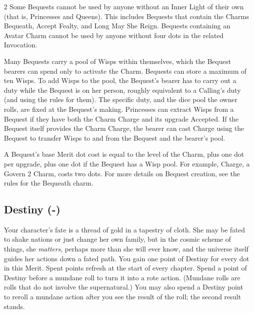 \begin{multicols}{2}
Some Bequests cannot be used by anyone without an Inner Light of their own (that is, Princesses and Queens). This includes Bequests that contain the Charms Bequeath, Accept Fealty, and Long May She Reign. Bequests containing an Avatar Charm cannot be used by anyone without four dots in the related Invocation.

Many Bequests carry a pool of Wisps within themselves, which the Bequest bearers can spend only to activate the Charm. Bequests can store a maximum of ten Wisps. To add Wisps to the pool, the Bequest’s bearer has to carry out a duty while the Bequest is on her person, roughly equivalent to a Calling's duty (and using the rules for them). The specific duty, and the dice pool the owner rolls, are fixed at the Bequest’s making. Princesses can extract Wisps from a Bequest if they have both the Charm Charge and its upgrade Accepted. If the Bequest itself provides the Charm Charge, the bearer can cast Charge using the Bequest to transfer Wisps to and from the Bequest and the bearer's pool. 

A Bequest's base Merit dot cost is equal to the level of the Charm, plus one dot per upgrade, plus one dot if the Bequest has a Wisp pool. For example, Charge, a Govern 2 Charm, costs two dots. For more details on Bequest creation, see the rules for the Bequeath charm.

\subsection*{Destiny (\textbullet\nobreak\hspace{.16667em}-\nobreak\hspace{.16667em}\textbullet\textbullet\textbullet\textbullet\textbullet)}

Your character’s fate is a thread of gold in a tapestry of cloth. She may be fated to shake nations or just change her own family, but in the cosmic scheme of things, she \textit{matters}, perhaps more than she will ever know, and the universe itself guides her actions down a fated path. You gain one point of Destiny for every dot in this Merit. Spent points refresh at the start of every chapter. Spend a point of Destiny before a mundane roll to turn it into a rote action. (Mundane rolls are rolls that do not involve the supernatural.) You may also spend a Destiny point to reroll a mundane action after you see the result of the roll; the second result stands. 


\end{multicols}
